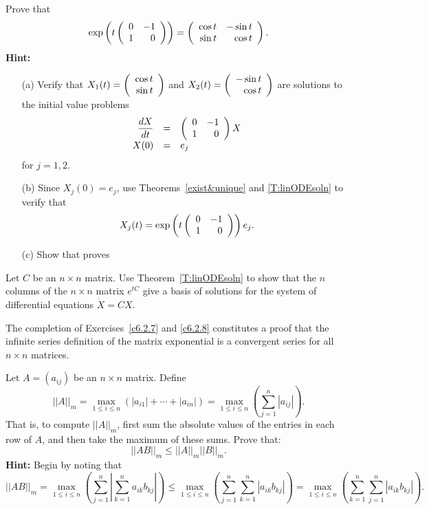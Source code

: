 \begin{exercise}  \label{c6.2.5C}
Prove that
\begin{equation}  \label{E:0-110E}
\exp\left(t\left(\begin{array}{rr} 0 & -1\\ 1 &0\end{array}\right)\right) =
\left(\begin{array}{rr} \cos t & -\sin t\\ \sin t &\cos t\end{array}\right).
\end{equation}
{\bf Hint:}
\begin{itemize}
\item[(a)] Verify that $X_1(t) = \left(\begin{array}{r} \cos t \\ \sin t\end{array}\right)$ and
$X_2(t) = \left(\begin{array}{r} -\sin t \\ \cos t\end{array}\right)$ are solutions to the initial value problems
\begin{equation}  \label{E:init3}
\begin{array}{rcl}
\displaystyle\frac{dX}{dt} & = & \left(\begin{array}{rr} 0 & -1\\ 1 &0\end{array}\right)X \\
X(0) & = & e_j
\end{array}
\end{equation}
for $j=1,2$.
\item[(b)] Since $X_j(0)=e_j$, use Theorems~\ref{exist&unique} and
\ref{T:linODEsoln} to verify that
\begin{equation}   \label{E:0-110}
X_j(t) = \exp\left(t\left(\begin{array}{rr} 0 & -1\\ 1 &0\end{array}\right)\right)e_j.
\end{equation}
\item[(c)]  Show that  proves 
\end{itemize}
\end{exercise}

\begin{exercise}  \label{c6.2.6A}
Let $C$ be an $n\times n$ matrix.  Use Theorem~\ref{T:linODEsoln} to show
that the $n$ columns of the $n\times n$ matrix $e^{tC}$ give a basis of
solutions for the system of differential equations $\dot{X}=CX$.
\end{exercise}

  The completion of Exercises~\ref{c6.2.7} and
\ref{c6.2.8} constitutes a proof that the infinite series definition of
the matrix exponential is a convergent series for all $n\times n$ matrices.

\begin{exercise}  \label{c6.2.7}
Let $A=(a_{ij})$ be an $n\times n$ matrix.  Define
\[
||A||_m = \max_{1\leq i\leq n} (|a_{i1}|+\cdots+|a_{in}|)
= \max_{1\leq i\leq n} \left(\sum_{j=1}^n|a_{ij}|\right).
\]
That is, to compute $||A||_m$, first sum the absolute values of the entries
in each row of $A$, and then take the maximum of these sums.  Prove that:
\[
||AB||_m \leq ||A||_m ||B||_m.
\]
{\bf Hint:} Begin by noting that
\[
||AB||_m =
\max_{1\leq i\leq n}\left(\sum_{j=1}^n\left|\sum_{k=1}^na_{ik}b_{kj}\right|
\right)\leq \max_{1\leq i\leq n}\left(\sum_{j=1}^n\sum_{k=1}^n\left|a_{ik}b_{kj}
\right|\right) = \max_{1\leq i\leq n}\left(\sum_{k=1}^n\sum_{j=1}^n
\left|a_{ik}b_{kj}\right|\right).
\]
\end{exercise}

